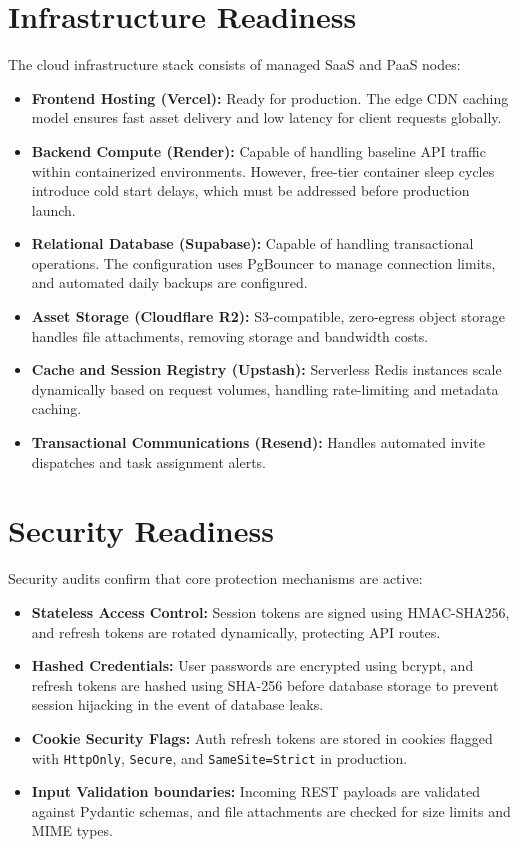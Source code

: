 \section{Infrastructure Readiness}
The cloud infrastructure stack consists of managed SaaS and PaaS nodes:
\begin{itemize}
    \item \textbf{Frontend Hosting (Vercel):} Ready for production. The edge CDN caching model ensures fast asset delivery and low latency for client requests globally.
    \item \textbf{Backend Compute (Render):} Capable of handling baseline API traffic within containerized environments. However, free-tier container sleep cycles introduce cold start delays, which must be addressed before production launch.
    \item \textbf{Relational Database (Supabase):} Capable of handling transactional operations. The configuration uses PgBouncer to manage connection limits, and automated daily backups are configured.
    \item \textbf{Asset Storage (Cloudflare R2):} S3-compatible, zero-egress object storage handles file attachments, removing storage and bandwidth costs.
    \item \textbf{Cache and Session Registry (Upstash):} Serverless Redis instances scale dynamically based on request volumes, handling rate-limiting and metadata caching.
    \item \textbf{Transactional Communications (Resend):} Handles automated invite dispatches and task assignment alerts.
\end{itemize}

\section{Security Readiness}
Security audits confirm that core protection mechanisms are active:
\begin{itemize}
    \item \textbf{Stateless Access Control:} Session tokens are signed using HMAC-SHA256, and refresh tokens are rotated dynamically, protecting API routes.
    \item \textbf{Hashed Credentials:} User passwords are encrypted using bcrypt, and refresh tokens are hashed using SHA-256 before database storage to prevent session hijacking in the event of database leaks.
    \item \textbf{Cookie Security Flags:} Auth refresh tokens are stored in cookies flagged with \texttt{HttpOnly}, \texttt{Secure}, and \texttt{SameSite=Strict} in production.
    \item \textbf{Input Validation boundaries:} Incoming REST payloads are validated against Pydantic schemas, and file attachments are checked for size limits and MIME types.
\end{itemize}

